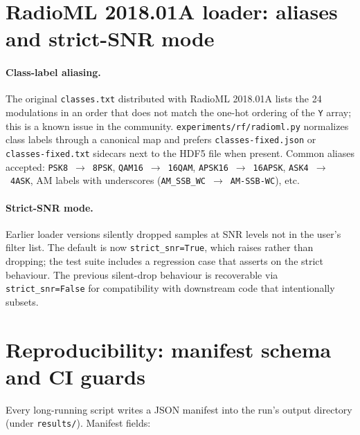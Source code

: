 \documentclass{article}
\newcommand{\code}[1]{\texttt{#1}}
\begin{document}
\section{RadioML 2018.01A loader: aliases and strict-SNR mode}
\label{app:radioml-loader}

\paragraph{Class-label aliasing.} The original
\code{classes.txt} distributed with RadioML 2018.01A lists the 24
modulations in an order that does not match the one-hot ordering of
the \code{Y} array; this is a known issue in the community.
\code{experiments/rf/radioml.py} normalizes class labels through a
canonical map and prefers \code{classes-fixed.json} or
\code{classes-fixed.txt} sidecars next to the HDF5 file when present.
Common aliases accepted: \code{PSK8}~$\to$~\code{8PSK},
\code{QAM16}~$\to$~\code{16QAM}, \code{APSK16}~$\to$~\code{16APSK},
\code{ASK4}~$\to$~\code{4ASK}, AM labels with underscores
(\code{AM\_SSB\_WC}~$\to$~\code{AM-SSB-WC}), etc.

\paragraph{Strict-SNR mode.} Earlier loader versions silently dropped
samples at SNR levels not in the user's filter list. The default is
now \code{strict\_snr=True}, which raises rather than dropping; the
test suite includes a regression case that asserts on the strict
behaviour. The previous silent-drop behaviour is recoverable via
\code{strict\_snr=False} for compatibility with downstream code that
intentionally subsets.

\section{Reproducibility: manifest schema and CI guards}
\label{app:reproducibility}

Every long-running script writes a JSON manifest into the run's output
directory (under \code{results/}). Manifest fields:
\end{document}
